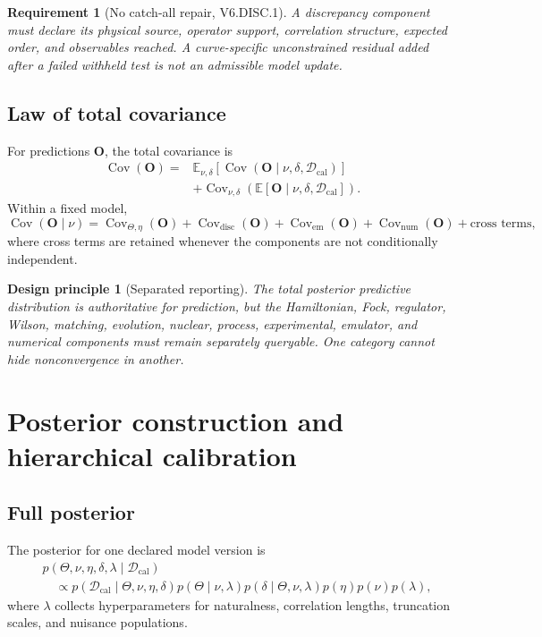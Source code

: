 \documentclass[11pt]{article}
\newtheorem{principle}[definition]{Design principle}
\newtheorem{requirement}[definition]{Requirement}
\newcommand{\Cov}{\operatorname{Cov}}
\newcommand{\E}{\mathbb E}
\newcommand{\caldata}{\mathcal D_{\mathrm{cal}}}
\newcommand{\num}{\mathrm{num}}
\newcommand{\emul}{\mathrm{em}}
\newcommand{\disc}{\mathrm{disc}}
\begin{document}
\begin{requirement}[No catch-all repair, V6.DISC.1]
A discrepancy component must declare its physical source, operator support,
correlation structure, expected order, and observables reached.  A
curve-specific unconstrained residual added after a failed withheld test is not
an admissible model update.
\end{requirement}

\subsection{Law of total covariance}

For predictions \(\bm O\), the total covariance is
\begin{align}
 \Cov(\bm O)
 ={}&
 \E_{\nu,\delta}\!\left[
 \Cov(\bm O\mid\nu,\delta,\caldata)
 \right]
 \nonumber\\
 &+
 \Cov_{\nu,\delta}\!\left(
 \E[\bm O\mid\nu,\delta,\caldata]
 \right).
 \label{eq:total-covariance}
\end{align}
Within a fixed model,
\begin{equation}
 \Cov(\bm O\mid\nu)
 =
 \Cov_{\Theta,\eta}(\bm O)
 +
 \Cov_{\disc}(\bm O)
 +
 \Cov_{\emul}(\bm O)
 +
 \Cov_{\num}(\bm O)
 +
 \text{cross terms},
 \label{eq:covariance-components}
\end{equation}
where cross terms are retained whenever the components are not conditionally
independent.

\begin{principle}[Separated reporting]
The total posterior predictive distribution is authoritative for prediction,
but the Hamiltonian, Fock, regulator, Wilson, matching, evolution, nuclear,
process, experimental, emulator, and numerical components must remain
separately queryable.  One category cannot hide nonconvergence in another.
\end{principle}

\section{Posterior construction and hierarchical calibration}
\label{sec:posterior}

\subsection{Full posterior}

The posterior for one declared model version is
\begin{align}
 &p(\Theta,\nu,\eta,\delta,\lambda\mid\caldata)
 \nonumber\\
 &\quad\propto
 p(\caldata\mid\Theta,\nu,\eta,\delta)
 p(\Theta\mid\nu,\lambda)
 p(\delta\mid\Theta,\nu,\lambda)
 p(\eta)
 p(\nu)
 p(\lambda),
 \label{eq:hierarchical-posterior}
\end{align}
where \(\lambda\) collects hyperparameters for naturalness, correlation
lengths, truncation scales, and nuisance populations.
\end{document}
